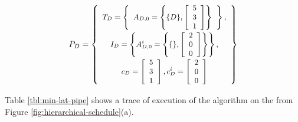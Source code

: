 \begin{displaymath} \small
P_D = \left\{
\begin{array}{c}
T_D = \left\{
\begin{array}{c}
A_{D,0} = \left\{ \{D\}, \left[\begin{array}{c} 5 \\ 3 \\ 1 \end{array}\right]\right\} \\
\end{array}\right\}, \\
I_D = \left\{ A^i_{D,0} = \left\{ \{ \}, \left[\begin{array}{c}2 \\ 0 \\ 0 \end{array}\right]\right\} \right\}, \\
c_D = \left[ \begin{array}{c} 5 \\ 3 \\ 1 \end{array} \right],
c^i_D = \left[ \begin{array}{c} 2 \\ 0 \\ 0
\end{array} \right]
\end{array}
\right\}
\end{displaymath}

\noindent Table \ref{tbl:min-lat-pipe} shows a trace of execution
of the algorithm on the {\pipeline} from Figure
\ref{fig:hierarchical-schedule}(a).

